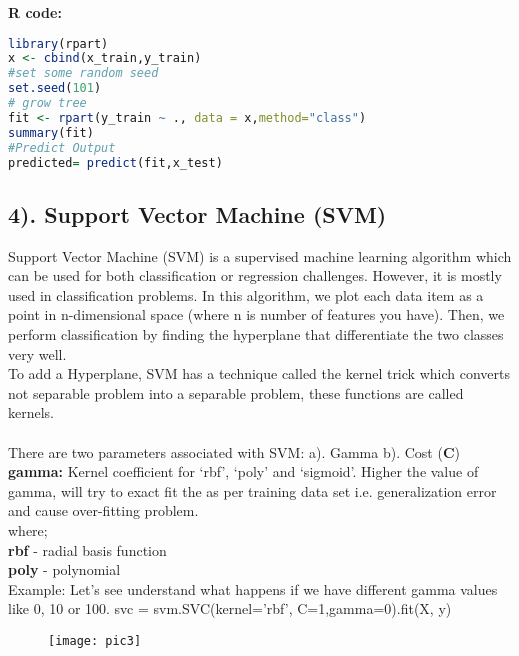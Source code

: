 \documentclass[Proceedings]{ascelike}
\begin{document}
\textbf{R code:}
\begin{lstlisting}[language=R]
library(rpart)
x <- cbind(x_train,y_train)
#set some random seed
set.seed(101)
# grow tree 
fit <- rpart(y_train ~ ., data = x,method="class")
summary(fit)
#Predict Output 
predicted= predict(fit,x_test)
\end{lstlisting}

\subsection{4). Support Vector Machine (SVM)}
Support Vector Machine (SVM) is a supervised machine learning algorithm which can be used for both classification or regression challenges. However, it is mostly used in classification problems. In this algorithm, we plot each data item as a point in n-dimensional space (where n is number of features you have). %
Then, we perform classification by finding the hyperplane that differentiate the two classes very well.\\
To add a Hyperplane, SVM has a technique called the kernel trick which converts not separable problem into a separable problem, these functions are called kernels.\\
\\There are two parameters associated with SVM:
\subitem a). Gamma 
\subitem b). Cost (\textbf{C})\\
\textbf{gamma:} Kernel coefficient for ‘rbf’, ‘poly’ and ‘sigmoid’. Higher the value of gamma, will try to exact fit the as per training data set i.e. generalization error and cause over-fitting problem.\\
where;\\
\textbf{rbf} - radial basis function \\
\textbf{poly} - polynomial \\

Example: Let’s see understand what happens if we have different gamma values like 0, 10 or 100.
svc = svm.SVC(kernel='rbf', C=1,gamma=0).fit(X, y)
\begin{figure}[!ht]
	\centering
	\texttt{[image: pic3]}
	\caption{}
	\label{fig:pic3}
\end{figure}
\end{document}
